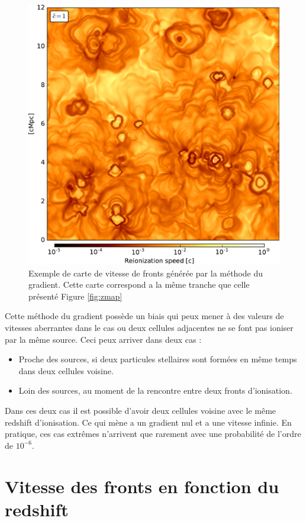 \begin{figure}[htpb]
        \includegraphics[width=.95\linewidth]{img/04_mapreio/map_v_c1.pdf} 
        \caption{Exemple de carte de vitesse de fronts générée par la méthode du gradient.
		 Cette carte correspond a la même tranche que celle présenté Figure \ref{fig:zmap}
        }
 		\label{fig:vmap}
\end{figure}

Cette méthode du gradient possède un biais qui peux mener à des valeurs de vitesses aberrantes dans le cas ou deux cellules adjacentes ne se font pas ioniser par la même source.
Ceci peux arriver dans deux cas : 
\begin{itemize}
\item Proche des sources, si deux particules stellaires sont formées en même temps dans deux cellules voisine.
\item Loin des sources, au moment de la rencontre entre deux fronts d'ionisation.
\end{itemize}

Dans ces deux cas il est possible d'avoir deux cellules voisine avec le même redshift d'ionisation.
Ce qui mène a un gradient nul et a une vitesse infinie.
En pratique, ces cas extrêmes n'arrivent que rarement avec une probabilité de l'ordre de $10^{-6}$.


\section{Vitesse des fronts en fonction du redshift}

